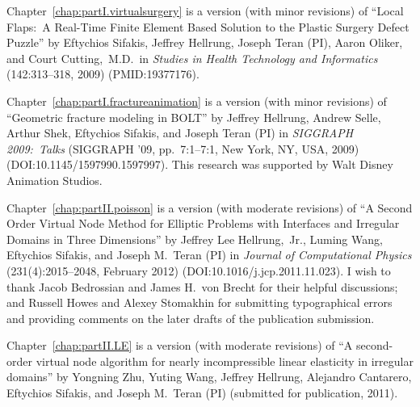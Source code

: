 {Chapter~\ref{chap:partI.virtualsurgery} is a version (with minor revisions) of ``Local Flaps:\ A Real-Time Finite Element Based Solution to the Plastic Surgery Defect Puzzle'' by Eftychios Sifakis, Jeffrey Hellrung, Joseph Teran (PI), Aaron Oliker, and Court Cutting,~M.D.\ in \textit{Studies in Health Technology and Informatics} (142:313--318, 2009) (PMID:19377176).

Chapter~\ref{chap:partI.fractureanimation} is a version (with minor revisions) of ``Geometric fracture modeling in BOLT'' by Jeffrey Hellrung, Andrew Selle, Arthur Shek, Eftychios Sifakis, and Joseph Teran (PI) in \textit{SIGGRAPH 2009:\ Talks} (SIGGRAPH '09, pp.\ 7:1--7:1, New York, NY, USA, 2009) \linebreak[4] (DOI:10.1145/1597990.1597997). This research was supported by Walt Disney Animation Studios.

Chapter~\ref{chap:partII.poisson} is a version (with moderate revisions) of ``A Second Order Virtual Node Method for Elliptic Problems with Interfaces and Irregular Domains in Three Dimensions'' by Jeffrey Lee Hellrung,~Jr., Luming Wang, Eftychios Sifakis, and Joseph M.\ Teran (PI) in \textit{Journal of Computational Physics} (231(4):2015--2048, February 2012) (DOI:10.1016/j.jcp.2011.11.023). I wish to thank Jacob Bedrossian and James H.\ von Brecht for their helpful discussions; and Russell Howes and Alexey Stomakhin for submitting typographical errors and providing comments on the later drafts of the publication submission.

Chapter~\ref{chap:partII.LE} is a version (with moderate revisions) of ``A second-order virtual node algorithm for nearly incompressible linear elasticity in irregular domains'' by Yongning Zhu, Yuting Wang, Jeffrey Hellrung, Alejandro Cantarero, Eftychios Sifakis, and Joseph M.\ Teran (PI) (submitted for publication, 2011).
}


